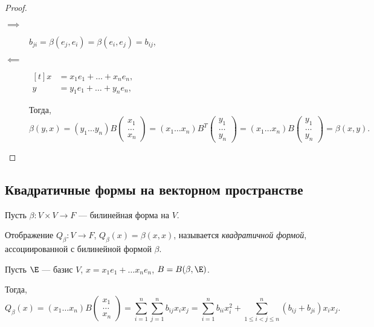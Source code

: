 \begin{proof}~
    \begin{description}
    \item[$\implies$] $b_{ji} = \beta(e_j, e_i) = \beta(e_i, e_j) = b_{ij}$, 
    \item[$\impliedby$] 
        \begin{math}
            \begin{aligned}[t]
                x &= x_1 e_1 + \dots + x_n e_n, \\
                y &= y_1 e_1 + \dots + y_n e_n,
            \end{aligned}
        \end{math}

        Тогда, 
        \begin{equation*}
            \beta(y, x) = (y_1 \dots y_n) B \begin{pmatrix} x_1 \\ \dots \\ x_n \end{pmatrix} = (x_1 \dots x_n) B^{T} \begin{pmatrix} y_1 \\ \dots \\ y_n \end{pmatrix} = (x_1 \dots x_n) B \begin{pmatrix} y_1 \\ \dots \\ y_n \end{pmatrix} = \beta(x, y)
        .\end{equation*}
    \end{description}
\end{proof}


\subsection{Квадратичные формы на векторном пространстве}

Пусть $\beta \colon V \times V \to F$ --- билинейная форма на $V$.

\begin{definition}
    Отображение $Q_\beta \colon V \to F$, $Q_\beta(x) = \beta(x, x)$, называется \textit{квадратичной формой}, ассоциированной с билинейной формой $\beta$.
\end{definition}

Пусть $\E$ --- базис $V$, $x = x_1 e_1 + \dots x_n e_n$, $B = B(\beta, \E)$.

Тогда,
\begin{equation*}
    Q_\beta(x) = (x_1 \dots x_n) B \begin{pmatrix} x_1 \\ \dots \\ x_n \end{pmatrix} = \sum_{i = 1}^{n} \sum_{j = 1}^{n} b_{ij} x_i x_j = \sum_{i = 1}^{n} b_{ii} x_i^2 + \sum_{1 \leq i < j \leq n}^{n} (b_{ij} + b_{ji}) x_i x_j
.\end{equation*}


